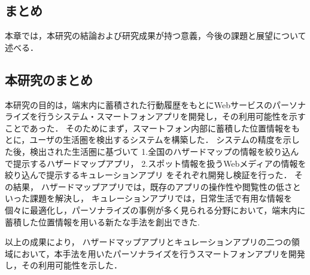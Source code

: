 \documentclass[a4paper]{jsarticle}
\begin{document}
\begin{enumerate}
\begin{enumerate}
\section{まとめ}
本章では，本研究の結論および研究成果が持つ意義，今後の課題と展望について述べる．

\subsection{本研究のまとめ}
本研究の目的は，端末内に蓄積された行動履歴をもとにWebサービスのパーソナライズを行うシステム・スマートフォンアプリを開発し，その利用可能性を示すことであった．
そのためにまず，スマートフォン内部に蓄積した位置情報をもとに，ユーザの生活圏を検出するシステムを構築した．
システムの精度を示した後，検出された生活圏に基づいて
1.全国のハザードマップの情報を絞り込んで提示するハザードマップアプリ，
2.スポット情報を扱うWebメディアの情報を絞り込んで提示するキュレーションアプリ
をそれぞれ開発し検証を行った．
その結果，
ハザードマップアプリでは，既存のアプリの操作性や閲覧性の低さといった課題を解決し，
キュレーションアプリでは，日常生活で有用な情報を個々に最適化し，パーソナライズの事例が多く見られる分野において，端末内に蓄積した位置情報を用いる新たな手法を創出できた.
%
%
%
%
%

以上の成果により，
ハザードマップアプリとキュレーションアプリの二つの領域において，本手法を用いたパーソナライズを行うスマートフォンアプリを開発し，その利用可能性を示した．


\end{enumerate}
\end{enumerate}
\end{document}
